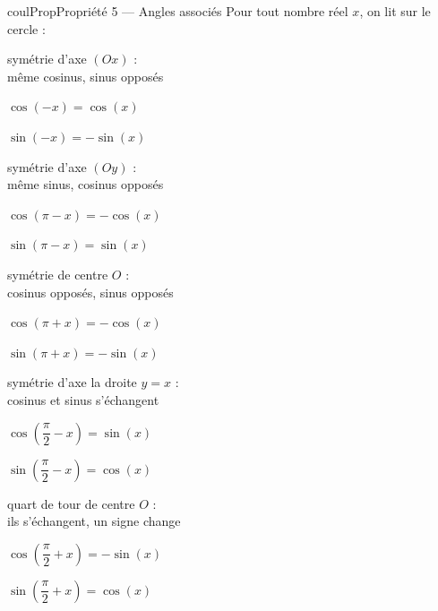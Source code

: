 \documentclass[11pt,a4paper]{article}
\makeatletter
\newcounter{lycee@signet}
\newcommand{\signet}[3][]{\stepcounter{lycee@signet}%
  \edef\lycee@dest{\if\relax\detokenize{#1}\relax
    signet.\arabic{lycee@signet}\else#1\fi}%
  \hypertarget{\lycee@dest}{}\bookmark[level=#2,dest=\lycee@dest]{#3}}
\newenvironment{proprietebox}[1][Propriété]%
  {\begin{boitecours}[phantom={\signet{2}{#1}}]{coulProp}{#1}}{\end{boitecours}}
\makeatother
\begin{document}
\begin{proprietebox}[Propriété 5 --- Angles associés]
Pour tout nombre réel $x$, on lit sur le cercle :

\medskip
\begin{minipage}[t]{0.32\linewidth}\centering
{}\par
{\small symétrie d'axe $(Ox)$ :\\ même cosinus, sinus opposés}\par\smallskip
$\cos(-x)=\cos(x)$\par
$\sin(-x)=-\sin(x)$
\end{minipage}\hfill
\begin{minipage}[t]{0.32\linewidth}\centering
{}\par
{\small symétrie d'axe $(Oy)$ :\\ même sinus, cosinus opposés}\par\smallskip
$\cos(\pi-x)=-\cos(x)$\par
$\sin(\pi-x)=\sin(x)$
\end{minipage}\hfill
\begin{minipage}[t]{0.32\linewidth}\centering
{}\par
{\small symétrie de centre $O$ :\\ cosinus opposés, sinus opposés}\par\smallskip
$\cos(\pi+x)=-\cos(x)$\par
$\sin(\pi+x)=-\sin(x)$
\end{minipage}

\medskip
\bigskip
\hfill
\begin{minipage}[t]{0.32\linewidth}\centering
{}\par
{\small symétrie d'axe la droite $y=x$ :\\ cosinus et sinus s'échangent}\par\smallskip
$\cos\left(\dfrac{\pi}{2}-x\right)=\sin(x)$\par\smallskip
$\sin\left(\dfrac{\pi}{2}-x\right)=\cos(x)$
\end{minipage}\hspace{1.5cm}
\begin{minipage}[t]{0.32\linewidth}\centering
{}\par
{\small quart de tour de centre $O$ :\\ ils s'échangent, un signe change}\par\smallskip
$\cos\left(\dfrac{\pi}{2}+x\right)=-\sin(x)$\par\smallskip
$\sin\left(\dfrac{\pi}{2}+x\right)=\cos(x)$
\end{minipage}
\hfill\null


\end{proprietebox}
\end{document}
